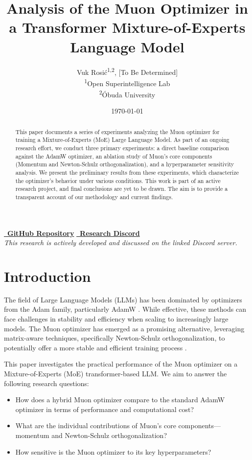\documentclass[11pt, a4paper]{article}
\title{\textbf{Analysis of the Muon Optimizer in a Transformer Mixture-of-Experts Language Model}}
\author{
    Vuk Rosić\textsuperscript{1,2}, [To Be Determined] \\
    \textsuperscript{1}Open Superintelligence Lab \\
    \textsuperscript{2}Óbuda University
}
\date{\today}
\begin{document}
\maketitle

\begin{abstract}
This paper documents a series of experiments analyzing the Muon optimizer for training a Mixture-of-Experts (MoE) Large Language Model. As part of an ongoing research effort, we conduct three primary experiments: a direct baseline comparison against the AdamW optimizer, an ablation study of Muon's core components (Momentum and Newton-Schulz orthogonalization), and a hyperparameter sensitivity analysis. We present the preliminary results from these experiments, which characterize the optimizer's behavior under various conditions. This work is part of an active research project, and final conclusions are yet to be drawn. The aim is to provide a transparent account of our methodology and current findings.
\end{abstract}

\begin{center}
    \vspace{1em}
    \href{https://github.com/vukrosic/analysis-of-muon-optimizer-in-llms}{\faGithub~\textbf{GitHub Repository}} \quad
    \href{https://discord.gg/6AbXGpKTwN}{\faDiscord~\textbf{Research Discord}} \\
    \small\textit{This research is actively developed and discussed on the linked Discord server.}
\end{center}

\section{Introduction}
The field of Large Language Models (LLMs) has been dominated by optimizers from the Adam family, particularly AdamW \cite{loshchilov2017decoupled, kingma2014adam}. While effective, these methods can face challenges in stability and efficiency when scaling to increasingly large models. The Muon optimizer has emerged as a promising alternative, leveraging matrix-aware techniques, specifically Newton-Schulz orthogonalization, to potentially offer a more stable and efficient training process \cite{bernstein2020metricizing, liu2025muon, jordan2024muon}.

This paper investigates the practical performance of the Muon optimizer on a Mixture-of-Experts (MoE) transformer-based LLM. We aim to answer the following research questions:
\begin{itemize}
    \item How does a hybrid Muon optimizer compare to the standard AdamW optimizer in terms of performance and computational cost?
    \item What are the individual contributions of Muon's core components—momentum and Newton-Schulz orthogonalization?
    \item How sensitive is the Muon optimizer to its key hyperparameters?
\end{itemize}
\end{document}
